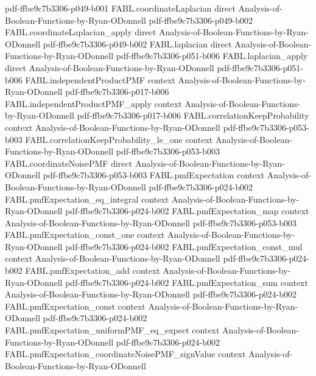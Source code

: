 \begin{theorem}
  {pdf-ffbe9c7b3306-p049-b001}
\proofstep
  {FABL.coordinateLaplacian}
  {direct}
  {Analysis-of-Boolean-Functions-by-Ryan-ODonnell}
  {pdf-ffbe9c7b3306-p049-b002}
\proofstep
  {FABL.coordinateLaplacian_apply}
  {direct}
  {Analysis-of-Boolean-Functions-by-Ryan-ODonnell}
  {pdf-ffbe9c7b3306-p049-b002}
\proofstep
  {FABL.laplacian}
  {direct}
  {Analysis-of-Boolean-Functions-by-Ryan-ODonnell}
  {pdf-ffbe9c7b3306-p051-b006}
\proofstep
  {FABL.laplacian_apply}
  {direct}
  {Analysis-of-Boolean-Functions-by-Ryan-ODonnell}
  {pdf-ffbe9c7b3306-p051-b006}
\proofstep
  {FABL.independentProductPMF}
  {context}
  {Analysis-of-Boolean-Functions-by-Ryan-ODonnell}
  {pdf-ffbe9c7b3306-p017-b006}
\proofstep
  {FABL.independentProductPMF_apply}
  {context}
  {Analysis-of-Boolean-Functions-by-Ryan-ODonnell}
  {pdf-ffbe9c7b3306-p017-b006}
\proofstep
  {FABL.correlationKeepProbability}
  {context}
  {Analysis-of-Boolean-Functions-by-Ryan-ODonnell}
  {pdf-ffbe9c7b3306-p053-b003}
\proofstep
  {FABL.correlationKeepProbability_le_one}
  {context}
  {Analysis-of-Boolean-Functions-by-Ryan-ODonnell}
  {pdf-ffbe9c7b3306-p053-b003}
\proofstep
  {FABL.coordinateNoisePMF}
  {direct}
  {Analysis-of-Boolean-Functions-by-Ryan-ODonnell}
  {pdf-ffbe9c7b3306-p053-b003}
\proofstep
  {FABL.pmfExpectation}
  {context}
  {Analysis-of-Boolean-Functions-by-Ryan-ODonnell}
  {pdf-ffbe9c7b3306-p024-b002}
\proofstep
  {FABL.pmfExpectation_eq_integral}
  {context}
  {Analysis-of-Boolean-Functions-by-Ryan-ODonnell}
  {pdf-ffbe9c7b3306-p024-b002}
\proofstep
  {FABL.pmfExpectation_map}
  {context}
  {Analysis-of-Boolean-Functions-by-Ryan-ODonnell}
  {pdf-ffbe9c7b3306-p053-b003}
\proofstep
  {FABL.pmfExpectation_const_one}
  {context}
  {Analysis-of-Boolean-Functions-by-Ryan-ODonnell}
  {pdf-ffbe9c7b3306-p024-b002}
\proofstep
  {FABL.pmfExpectation_const_mul}
  {context}
  {Analysis-of-Boolean-Functions-by-Ryan-ODonnell}
  {pdf-ffbe9c7b3306-p024-b002}
\proofstep
  {FABL.pmfExpectation_add}
  {context}
  {Analysis-of-Boolean-Functions-by-Ryan-ODonnell}
  {pdf-ffbe9c7b3306-p024-b002}
\proofstep
  {FABL.pmfExpectation_sum}
  {context}
  {Analysis-of-Boolean-Functions-by-Ryan-ODonnell}
  {pdf-ffbe9c7b3306-p024-b002}
\proofstep
  {FABL.pmfExpectation_const}
  {context}
  {Analysis-of-Boolean-Functions-by-Ryan-ODonnell}
  {pdf-ffbe9c7b3306-p024-b002}
\proofstep
  {FABL.pmfExpectation_uniformPMF_eq_expect}
  {context}
  {Analysis-of-Boolean-Functions-by-Ryan-ODonnell}
  {pdf-ffbe9c7b3306-p024-b002}
\proofstep
  {FABL.pmfExpectation_coordinateNoisePMF_signValue}
  {context}
  {Analysis-of-Boolean-Functions-by-Ryan-ODonnell}

\end{theorem}
